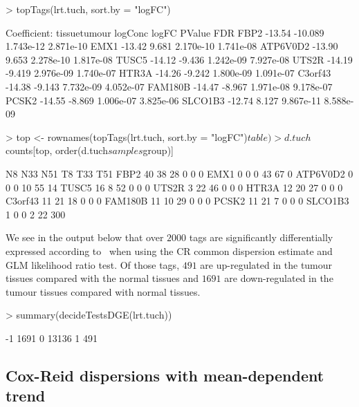 \begin{Schunk}
\begin{Sinput}
> topTags(lrt.tuch, sort.by = "logFC")
\end{Sinput}
\begin{Soutput}
Coefficient: tissuetumour 
         logConc   logFC    PValue       FDR
FBP2      -13.54 -10.089 1.743e-12 2.871e-10
EMX1      -13.42   9.681 2.170e-10 1.741e-08
ATP6V0D2  -13.90   9.653 2.278e-10 1.817e-08
TUSC5     -14.12  -9.436 1.242e-09 7.927e-08
UTS2R     -14.19  -9.419 2.976e-09 1.740e-07
HTR3A     -14.26  -9.242 1.800e-09 1.091e-07
C3orf43   -14.38  -9.143 7.732e-09 4.052e-07
FAM180B   -14.47  -8.967 1.971e-08 9.178e-07
PCSK2     -14.55  -8.869 1.006e-07 3.825e-06
SLCO1B3   -12.74   8.127 9.867e-11 8.588e-09
\end{Soutput}
\begin{Sinput}
> top <- rownames(topTags(lrt.tuch, sort.by = "logFC")$table)
> d.tuch$counts[top, order(d.tuch$samples$group)]
\end{Sinput}
\begin{Soutput}
         N8 N33 N51 T8 T33 T51
FBP2     40  38  28  0   0   0
EMX1      0   0   0 43  67   0
ATP6V0D2  0   0   0 10  55  14
TUSC5    16   8  52  0   0   0
UTS2R     3  22  46  0   0   0
HTR3A    12  20  27  0   0   0
C3orf43  11  21  18  0   0   0
FAM180B  11  10  29  0   0   0
PCSK2    11  21   7  0   0   0
SLCO1B3   1   0   0  2  22 300
\end{Soutput}
\end{Schunk}


We see in the output below that over $2000$ tags are significantly
differentially expressed according to \edgeR~when using the CR common
dispersion estimate and GLM likelihood ratio test. Of those tags,
$491$ are up-regulated in the tumour tissues compared with the normal
tissues and $1691$ are down-regulated in the tumour tissues compared
with normal tissues.

\begin{Schunk}
\begin{Sinput}
> summary(decideTestsDGE(lrt.tuch))
\end{Sinput}
\begin{Soutput}
   [,1] 
-1  1691
0  13136
1    491
\end{Soutput}
\end{Schunk}


\subsection{Cox-Reid dispersions with mean-dependent trend}
\label{sec:cox-reid-dispersions}

